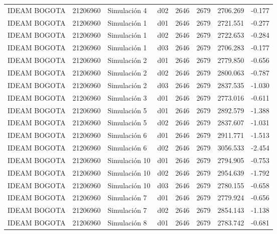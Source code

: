 \begin{landscape}
\begin{longtable}{lrlp{2cm}p{2cm}p{3cm}p{2cm}r}
            IDEAM BOGOTA &  21206960 &   Simulación 4 &   d02 &      2646 &     2679 &  2706.269 &    -0.177 \\
            IDEAM BOGOTA &  21206960 &   Simulación 1 &   d01 &      2646 &     2679 &  2721.551 &    -0.277 \\
            IDEAM BOGOTA &  21206960 &   Simulación 1 &   d02 &      2646 &     2679 &  2722.653 &    -0.284 \\
            IDEAM BOGOTA &  21206960 &   Simulación 1 &   d03 &      2646 &     2679 &  2706.283 &    -0.177 \\
            IDEAM BOGOTA &  21206960 &   Simulación 2 &   d01 &      2646 &     2679 &  2779.850 &    -0.656 \\
            IDEAM BOGOTA &  21206960 &   Simulación 2 &   d02 &      2646 &     2679 &  2800.063 &    -0.787 \\
            IDEAM BOGOTA &  21206960 &   Simulación 2 &   d03 &      2646 &     2679 &  2837.535 &    -1.030 \\
            IDEAM BOGOTA &  21206960 &   Simulación 3 &   d01 &      2646 &     2679 &  2773.016 &    -0.611 \\
            IDEAM BOGOTA &  21206960 &   Simulación 5 &   d01 &      2646 &     2679 &  2892.579 &    -1.388 \\
            IDEAM BOGOTA &  21206960 &   Simulación 5 &   d02 &      2646 &     2679 &  2837.607 &    -1.031 \\
            IDEAM BOGOTA &  21206960 &   Simulación 6 &   d01 &      2646 &     2679 &  2911.771 &    -1.513 \\
            IDEAM BOGOTA &  21206960 &   Simulación 6 &   d02 &      2646 &     2679 &  3056.533 &    -2.454 \\
            IDEAM BOGOTA &  21206960 &  Simulación 10 &   d01 &      2646 &     2679 &  2794.905 &    -0.753 \\
            IDEAM BOGOTA &  21206960 &  Simulación 10 &   d02 &      2646 &     2679 &  2954.639 &    -1.792 \\
            IDEAM BOGOTA &  21206960 &  Simulación 10 &   d03 &      2646 &     2679 &  2780.155 &    -0.658 \\
            IDEAM BOGOTA &  21206960 &   Simulación 7 &   d01 &      2646 &     2679 &  2779.924 &    -0.656 \\
            IDEAM BOGOTA &  21206960 &   Simulación 7 &   d02 &      2646 &     2679 &  2854.143 &    -1.138 \\
            IDEAM BOGOTA &  21206960 &   Simulación 8 &   d01 &      2646 &     2679 &  2783.742 &    -0.681 \\

\end{longtable}
\end{landscape}
